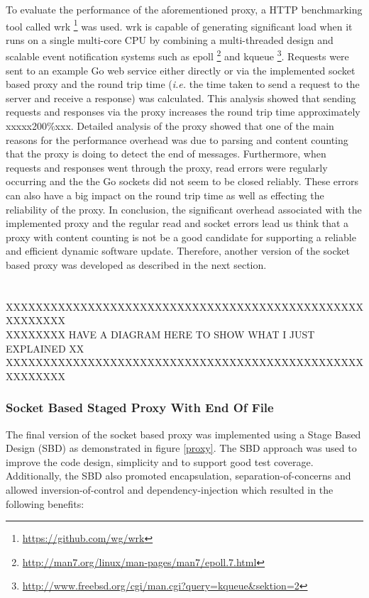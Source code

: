 \documentclass[a4paper,11pt,twoside]{article}
\begin{document}
To evaluate the performance of the aforementioned proxy, a HTTP benchmarking tool called wrk \footnote{\label{wrk} \url{https://github.com/wg/wrk}} was used. wrk is capable of generating significant load when it runs on a single multi-core CPU by combining a multi-threaded design and scalable event notification systems such as epoll \footnote{\label{epoll} \url{http://man7.org/linux/man-pages/man7/epoll.7.html}} and kqueue \footnote{\label{wrk} \url{http://www.freebsd.org/cgi/man.cgi?query=kqueue&sektion=2}}. Requests were sent to an example Go web service either directly or via the implemented socket based proxy and the round trip time (\textit{i.e.} the time taken to send a request to the server and receive a response) was calculated. This analysis showed that sending requests and responses via the proxy increases the round trip time approximately xxxxx200\%xxx. Detailed analysis of the proxy showed that one of the main reasons for the performance overhead was due to parsing and content counting that the proxy is doing to detect the end of messages. Furthermore, when requests and responses went through the proxy, read errors were regularly occurring and the the Go sockets did not seem to be closed reliably. These errors can also have a big impact on the round trip time as well as effecting the reliability of the proxy. In conclusion, the significant overhead associated with the implemented proxy and the regular read and socket errors lead us think that a proxy with content counting  is not be a good candidate for supporting a reliable and efficient dynamic software update. Therefore, another version of the socket based proxy was developed as described in the next section.\\ \\ \\

XXXXXXXXXXXXXXXXXXXXXXXXXXXXXXXXXXXXXXXXXXXXXXXXXXXXXXXX\\
XXXXXXXX HAVE A DIAGRAM HERE TO SHOW WHAT I JUST EXPLAINED XX\\
XXXXXXXXXXXXXXXXXXXXXXXXXXXXXXXXXXXXXXXXXXXXXXXXXXXXXXXX\\    

\subsubsection{Socket Based Staged Proxy With End Of File}\label{staged}
The final version of the socket based proxy was implemented using a Stage Based Design (SBD) as demonstrated in figure \ref{proxy}. The SBD  approach was used to improve the code design, simplicity and to support good test coverage. Additionally, the SBD also promoted encapsulation, separation-of-concerns and allowed inversion-of-control and dependency-injection which resulted in the following benefits:
\end{document}
